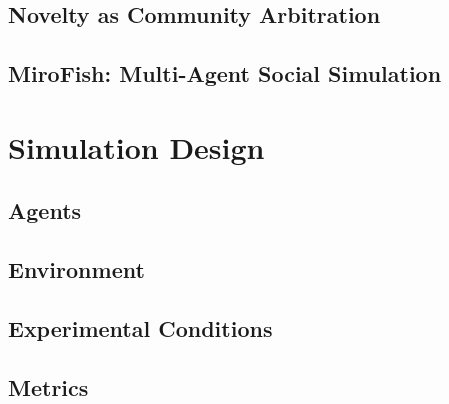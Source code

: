\documentclass[11pt]{article}
\begin{document}
\subsection{Novelty as Community Arbitration}

\subsection{MiroFish: Multi-Agent Social Simulation}

\section{Simulation Design}
\label{sec:design}

\subsection{Agents}

\subsection{Environment}

\subsection{Experimental Conditions}

\subsection{Metrics}
\end{document}
